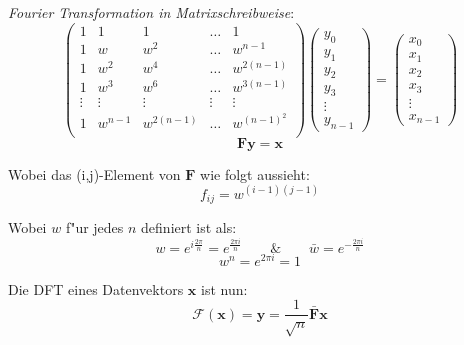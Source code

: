 \documentclass[german, 10pt, a4paper, twocolumn]{scrartcl}
\begin{document}
\textit{Fourier Transformation in Matrixschreibweise}:
\small
\begin{displaymath}
	\left (
		\begin{array}{ccccc}
			1 &		1 &		1 &		\ldots &		1 \\
			1 &		w &		w^2 &		\ldots &		w^{n-1}\\
			1 &		w^2 &		w^4 &		\ldots &		w^{2(n-1)}\\
			1 &		w^3 &		w^6 &		\ldots &		w^{3(n-1)}\\
			\vdots &	\vdots &	\vdots &	\vdots &		\vdots \\
			1 &		w^{n-1} &	w^{2(n-1)} &	\ldots &		w^{(n-1)^2}\\
		\end{array}
	\right )
	\left (
		\begin{array}{c}
			y_0\\
			y_1\\
			y_2\\
			y_3\\
			\vdots\\
			y_{n-1}
		\end{array}
	\right )
	=
	\left (
		\begin{array}{c}
			x_0\\
			x_1\\
			x_2\\
			x_3\\
			\vdots\\
			x_{n-1}
		\end{array}
	\right )
\end{displaymath}
\normalsize
\begin{displaymath}
	\mathbf{F} \mathbf{y} = \mathbf{x}
\end{displaymath}

Wobei das (i,j)-Element von $\mathbf{F}$ wie folgt aussieht:
\begin{displaymath}
	f_{ij} = w^{(i-1)(j-1)}
\end{displaymath}

Wobei $w$ f"ur jedes $n$ definiert ist als:
\begin{displaymath}
	w=e^{i\frac{2\pi}{n}}=e^{\frac{2\pi i}{n}} \qquad \& \qquad \bar{w} = e^{-\frac{2\pi i}{n}}
\end{displaymath}
\begin{displaymath}
	w^n=e^{2\pi i}=1
\end{displaymath}

Die DFT eines Datenvektors $\mathbf{x}$ ist nun:
\begin{displaymath}
	\mathcal{F}(\mathbf{x}) = \mathbf{y} = \frac{1}{\sqrt{n}}\mathbf{\bar{F}}\mathbf{x}
\end{displaymath}
\end{document}
